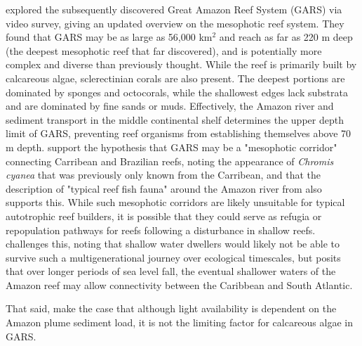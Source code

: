 \documentclass[11pt,a4paper]{article}
\begin{document}


\cite{Francini-Filho2018} explored the subsequently discovered Great Amazon Reef System (GARS) via video survey, giving an updated overview on the mesophotic reef system. They found that GARS may be as large as 56,000 km$^{2}$ and reach as far as 220 m deep (the deepest mesophotic reef that far discovered), and is potentially more complex and diverse than previously thought. While the reef is primarily built by calcareous algae, sclerectinian corals are also present. The deepest portions are dominated by sponges and octocorals, while the shallowest edges lack substrata and are dominated by fine sands or muds. Effectively, the Amazon river and sediment transport in the middle continental shelf determines the upper depth limit of GARS, preventing reef organisms from establishing themselves above 70 m depth. \cite{Francini-Filho2018} support the hypothesis that GARS may be a "mesophotic corridor" connecting Carribean and Brazilian reefs, noting the appearance of \textit{Chromis cyanea} that was previously only known from the Carribean, and that the description of "typical reef fish fauna" around the Amazon river from \cite{collette1977} also supports this. While such mesophotic corridors are likely unsuitable for typical autotrophic reef builders, it is possible that they could serve as refugia or repopulation pathways for reefs following a disturbance in shallow reefs. \cite{Moura2016} challenges this, noting that shallow water dwellers would likely not be able to survive such a multigenerational journey over ecological timescales, but posits that over longer periods of sea level fall, the eventual shallower waters of the Amazon reef may allow connectivity between the Caribbean and South Atlantic.



That said, \cite{Francini-Filho2018} make the case that although light availability is dependent on the Amazon plume sediment load, it is not the limiting factor for calcareous algae in GARS. %


\end{document}
